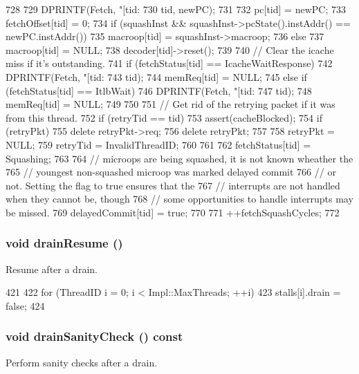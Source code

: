 \begin{DoxyCode}
728 {
729     DPRINTF(Fetch, "[tid:%
730             tid, newPC);
731 
732     pc[tid] = newPC;
733     fetchOffset[tid] = 0;
734     if (squashInst && squashInst->pcState().instAddr() == newPC.instAddr())
735         macroop[tid] = squashInst->macroop;
736     else
737         macroop[tid] = NULL;
738     decoder[tid]->reset();
739 
740     // Clear the icache miss if it's outstanding.
741     if (fetchStatus[tid] == IcacheWaitResponse) {
742         DPRINTF(Fetch, "[tid:%
743                 tid);
744         memReq[tid] = NULL;
745     } else if (fetchStatus[tid] == ItlbWait) {
746         DPRINTF(Fetch, "[tid:%
747                 tid);
748         memReq[tid] = NULL;
749     }
750 
751     // Get rid of the retrying packet if it was from this thread.
752     if (retryTid == tid) {
753         assert(cacheBlocked);
754         if (retryPkt) {
755             delete retryPkt->req;
756             delete retryPkt;
757         }
758         retryPkt = NULL;
759         retryTid = InvalidThreadID;
760     }
761 
762     fetchStatus[tid] = Squashing;
763 
764     // microops are being squashed, it is not known wheather the
765     // youngest non-squashed microop was  marked delayed commit
766     // or not. Setting the flag to true ensures that the
767     // interrupts are not handled when they cannot be, though
768     // some opportunities to handle interrupts may be missed.
769     delayedCommit[tid] = true;
770 
771     ++fetchSquashCycles;
772 }
\end{DoxyCode}
\hypertarget{classDefaultFetch_a8f020d3237536fe007fc488c4125c5d8}{
\subsubsection[{drainResume}]{\setlength{\rightskip}{0pt plus 5cm}void drainResume ()}}
\label{classDefaultFetch_a8f020d3237536fe007fc488c4125c5d8}
Resume after a drain. 


\begin{DoxyCode}
421 {
422     for (ThreadID i = 0; i < Impl::MaxThreads; ++i)
423         stalls[i].drain = false;
424 }
\end{DoxyCode}
\hypertarget{classDefaultFetch_a0240eb42fa57fe5d3788093f62b77347}{
\subsubsection[{drainSanityCheck}]{\setlength{\rightskip}{0pt plus 5cm}void drainSanityCheck () const}}
\label{classDefaultFetch_a0240eb42fa57fe5d3788093f62b77347}
Perform sanity checks after a drain. 


